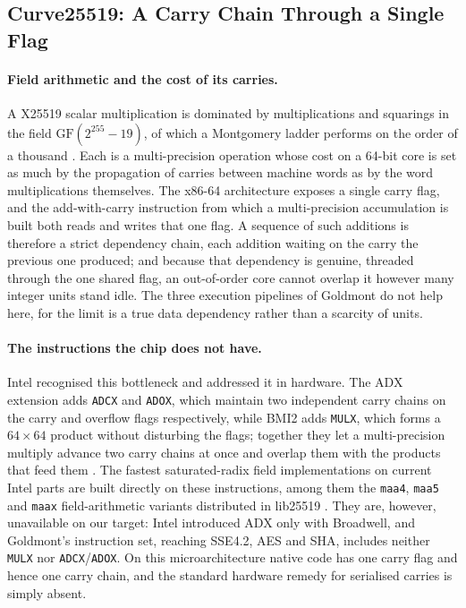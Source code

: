 \subsection{Curve25519: A Carry Chain Through a Single Flag}
\label{sec:challenge-curve25519}

\paragraph{Field arithmetic and the cost of its carries.}
A X25519 scalar multiplication is dominated by multiplications and squarings in
the field $\mathrm{GF}(2^{255}-19)$, of which a Montgomery ladder performs on the
order of a thousand \cite{PKC:Bernstein06}. Each is a multi-precision operation
whose cost on a 64-bit core is set as much by the propagation of carries between
machine words as by the word multiplications themselves. The x86-64 architecture
exposes a single carry flag, and the add-with-carry instruction from which a
multi-precision accumulation is built both reads and writes that one flag. A
sequence of such additions is therefore a strict dependency chain, each addition
waiting on the carry the previous one produced; and because that dependency is
genuine, threaded through the one shared flag, an out-of-order core cannot overlap
it however many integer units stand idle. The three execution pipelines of
Goldmont do not help here, for the limit is a true data dependency rather than a
scarcity of units.

\paragraph{The instructions the chip does not have.}
Intel recognised this bottleneck and addressed it in hardware. The ADX extension
adds \texttt{ADCX} and \texttt{ADOX}, which maintain two independent carry chains
on the carry and overflow flags respectively, while BMI2 adds \texttt{MULX},
which forms a $64\times64$ product without disturbing the flags; together they let
a multi-precision multiply advance two carry chains at once and overlap them with
the products that feed them \cite{intelLargeIntegerArithmetic2012}. The fastest
saturated-radix field implementations on current Intel parts are built directly on
these instructions, among them the \texttt{maa4}, \texttt{maa5} and \texttt{maax}
field-arithmetic variants distributed in lib25519
\cite{nathSarkarEfficientArithmetic2022,kuepperCryptOpt2023}.
They are, however, unavailable on our target: Intel introduced ADX only with
Broadwell, and Goldmont's instruction set, reaching SSE4.2, AES and SHA, includes
neither \texttt{MULX} nor \texttt{ADCX}/\texttt{ADOX}. On this microarchitecture
native code has one carry flag and hence one carry chain, and the standard
hardware remedy for serialised carries is simply absent.

